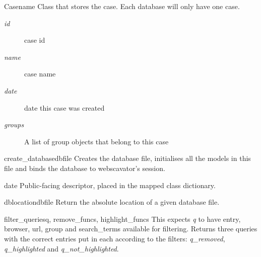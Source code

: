 \documentclass[letterpaper,10pt,english]{manual}
\begin{document}
\hypertarget{webscavator.model.models.Case}{}\begin{classdesc}{Case}{name}
Class that stores the case. Each database will only have one case.
\begin{description}
\item[\emph{id}    ]
case id

\item[\emph{name}]
case name

\item[\emph{date}]
date this case was created

\item[\emph{groups}]
A list of group objects that belong to this case

\end{description}

\hypertarget{webscavator.model.models.Case.create_database}{}\begin{staticmethoddesc}{create\_database}{dbfile}
Creates the database file, initialises all the models in this file and binds the 
database to webscavator's session.
\end{staticmethoddesc}

\hypertarget{webscavator.model.models.Case.date}{}\begin{memberdesc}{date}
Public-facing descriptor, placed in the mapped class dictionary.
\end{memberdesc}

\hypertarget{webscavator.model.models.Case.dblocation}{}\begin{methoddesc}{dblocation}{dbfile}
Return the absolute location of a given database file.
\end{methoddesc}

\hypertarget{webscavator.model.models.Case.filter_queries}{}\begin{staticmethoddesc}{filter\_queries}{q, remove\_funcs, highlight\_funcs}
This expects \emph{q} to have entry, browser, url, group and search\_terms available 
for filtering. Returns three queries with the correct entries put in each according
to the filters:
\emph{q\_removed}, \emph{q\_highlighted} and \emph{q\_not\_highlighted}.
\end{staticmethoddesc}


\end{classdesc}
\end{document}
